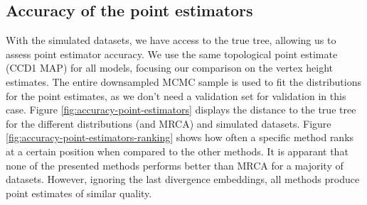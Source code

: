 \documentclass[10pt,letterpaper]{article}
\begin{document}
\subsection*{Accuracy of the point estimators}

With the simulated datasets, we have access to the true tree, allowing us to assess point estimator accuracy. We use the same topological point estimate (CCD1 MAP) for all models, focusing our comparison on the vertex height estimates. The entire downsampled MCMC sample is used to fit the distributions for the point estimates, as we don't need a validation set for validation in this case. Figure \ref{fig:accuracy-point-estimators} displays the distance to the true tree for the different distributions (and MRCA) and simulated datasets. Figure \ref{fig:accuracy-point-estimators-ranking} shows how often a specific method ranks at a certain position when compared to the other methods. It is apparant that none of the presented methods performs better than MRCA for a majority of datasets. However, ignoring the last divergence embeddings, all methods produce point estimates of similar quality.
\end{document}

